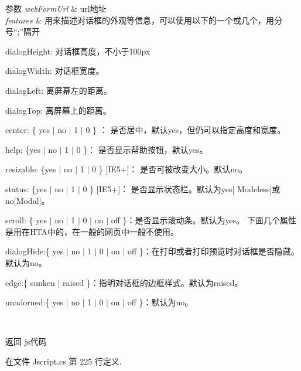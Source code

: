 \begin{DoxyParams}{参数}
{\em web\-Form\-Url} & url地址\\
\hline
{\em features} & 用来描述对话框的外观等信息，可以使用以下的一个或几个，用分号“;”隔开
\begin{DoxyEnumerate}
\item dialog\-Height\-: 对话框高度，不小于100px
\item dialog\-Width\-: 对话框宽度。
\item dialog\-Left\-: 离屏幕左的距离。
\item dialog\-Top\-: 离屏幕上的距离。
\item center\-: \{ yes $|$ no $|$ 1 $|$ 0 \} ： 是否居中，默认yes，但仍可以指定高度和宽度。
\item help\-: \{yes $|$ no $|$ 1 $|$ 0 \}： 是否显示帮助按钮，默认yes。
\item resizable\-: \{yes $|$ no $|$ 1 $|$ 0 \} \mbox{[}I\-E5+\mbox{]}： 是否可被改变大小。默认no。
\item status\-: \{yes $|$ no $|$ 1 $|$ 0 \} \mbox{[}I\-E5+\mbox{]}： 是否显示状态栏。默认为yes\mbox{[} Modeless\mbox{]}或no\mbox{[}Modal\mbox{]}。
\item scroll\-: \{ yes $|$ no $|$ 1 $|$ 0 $|$ on $|$ off \}：是否显示滚动条。默认为yes。 下面几个属性是用在\-H\-T\-A中的，在一般的网页中一般不使用。
\item dialog\-Hide\-:\{ yes $|$ no $|$ 1 $|$ 0 $|$ on $|$ off \}：在打印或者打印预览时对话框是否隐藏。默认为no。
\item edge\-:\{ sunken $|$ raised \}：指明对话框的边框样式。默认为raised。
\item unadorned\-:\{ yes $|$ no $|$ 1 $|$ 0 $|$ on $|$ off \}：默认为no。 
\end{DoxyEnumerate}\\
\hline
\end{DoxyParams}
\begin{DoxyReturn}{返回}
js代码
\end{DoxyReturn}


在文件 Jscript.\-cs 第 225 行定义.

